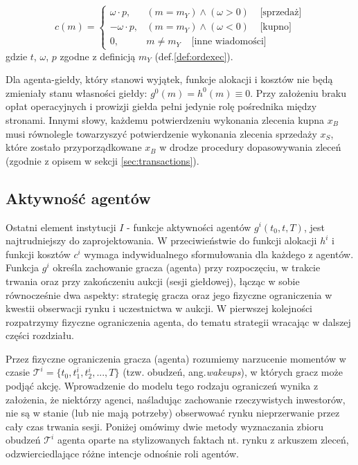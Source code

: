 $$ c(m) = 
 \left\{\begin{array}{lr}
        \omega \cdot p, & (m = m_Y) \wedge (\omega>0)\;\;\;\;\text{[sprzedaż]}\\
        -\omega \cdot p, & (m=m_Y) \wedge (\omega <0)\;\;\;\; \text{[kupno]}\\
        0, & m\neq m_Y \;\;\;\; \text{[inne wiadomości]}
        \end{array}
$$
gdzie $t$, $\omega$, $p$ zgodne z definicją $m_Y$ (def.\ref{def:ordexec}). 

Dla agenta-giełdy, który stanowi wyjątek, funkcje alokacji i kosztów nie będą zmieniały stanu własności giełdy: $g^0(m) = h^0(m) \equiv 0$. Przy założeniu braku opłat operacyjnych i prowizji giełda pełni jedynie rolę pośrednika między stronami. Innymi słowy, każdemu potwierdzeniu wykonania zlecenia kupna $x_B$ musi równolegle towarzyszyć potwierdzenie wykonania zlecenia sprzedaży $x_S$, które zostało przyporządkowane $x_B$ w drodze procedury dopasowywania zleceń (zgodnie z opisem w sekcji \ref{sec:transactions}).
\subsection{Aktywność agentów}\label{sec:agentactivity}
Ostatni element instytucji $I$ - funkcje aktywności agentów $g^i(t_0, t, T)$, jest najtrudniejszy do zaprojektowania. W przeciwieństwie do funkcji alokacji $h^i$ i funkcji kosztów $c^i$ wymaga indywidualnego sformułowania dla każdego z agentów. Funkcja $g^i$ określa zachowanie gracza (agenta) przy rozpoczęciu, w trakcie trwania oraz przy zakończeniu aukcji (sesji giełdowej), łącząc w sobie równocześnie dwa aspekty: strategię gracza oraz jego fizyczne ograniczenia w kwestii obserwacji rynku i uczestnictwa w aukcji. W pierwszej kolejności rozpatrzymy fizyczne ograniczenia agenta, do tematu strategii wracając w dalszej części rozdziału.

Przez fizyczne ograniczenia gracza (agenta) rozumiemy narzucenie momentów w czasie $\mathcal{T}^i = \{t_0, t^i_1, t^i_2, ..., T\}$ (tzw. obudzeń, ang.\textit{wakeups}), w których gracz może podjąć akcję. Wprowadzenie do modelu tego rodzaju ograniczeń wynika z założenia, że niektórzy agenci, naśladując zachowanie rzeczywistych inwestorów, nie są w stanie (lub nie mają potrzeby) obserwować rynku nieprzerwanie przez cały czas trwania sesji. Poniżej omówimy dwie metody wyznaczania zbioru obudzeń $\mathcal{T}^i$ agenta oparte na stylizowanych faktach nt. rynku z arkuszem zleceń, odzwierciedlające różne intencje odnośnie roli agentów.

